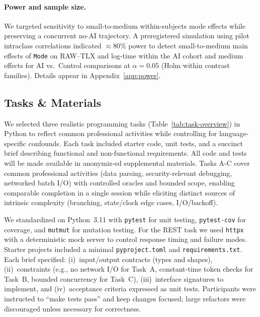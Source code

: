 \documentclass[sigconf]{acmart}
\begin{document}
\paragraph{Power and sample size.}
We targeted sensitivity to small\hyp{}to\hyp{}medium within-subjects mode effects while preserving a concurrent no-AI trajectory. A preregistered simulation using pilot intraclass correlations indicated $\approx 80\%$ power to detect small-to-medium main effects of \texttt{Mode} on RAW--TLX and log-time within the AI cohort and medium effects for AI vs.\ Control comparisons at $\alpha{=}0.05$ (Holm within contrast families). Details appear in Appendix~\ref{app:power}.
\subsection{Tasks \& Materials}
\label{sec:tasks}

We selected three realistic programming tasks (Table~\ref{tab:task-overview}) in Python to reflect common professional activities while controlling for language-specific confounds. Each task included starter code, unit tests, and a succinct brief describing functional and non-functional requirements. All code and tests will be made available in anonymiz-ed supplemental materials. Tasks A-C cover common professional activities (data parsing, security-relevant debugging, networked batch I/O) with controlled oracles and bounded scope, enabling comparable completion in a single session while eliciting distinct sources of intrinsic complexity (branching, state/clock edge cases, I/O/backoff).

We standardized on Python~3.11 with \texttt{pytest} for unit testing, \texttt{pytest-cov} for coverage, and \texttt{mutmut} for mutation testing. For the REST task we used \texttt{httpx} with a deterministic mock server to control response timing and failure modes. Starter projects included a minimal \texttt{pyproject.toml} and \texttt{requirements.txt}. Each brief specified: (i)~input/output contracts (types and shapes), (ii)~constraints (e.g., no network I/O for Task~A, constant-time token checks for Task~B, bounded concurrency for Task~C), (iii)~interface signatures to implement, and (iv)~acceptance criteria expressed as unit tests. Participants were instructed to ``make tests pass'' and keep changes focused; large refactors were discouraged unless necessary for correctness.
\end{document}
